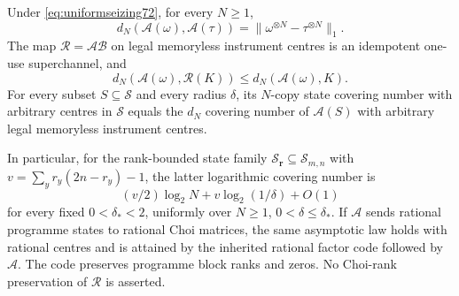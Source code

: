 \begin{theorem}\label{thm:seizablecover72}
Under \eqref{eq:uniformseizing72}, for every $N\ge1$,
\begin{equation}\label{eq:seizablemetric72}
 d_N(\mathcal A(\omega),\mathcal A(\tau))
                =\|\omega^{\otimes N}-\tau^{\otimes N}\|_1.
\end{equation}
The map $\mathcal R=\mathcal A\mathcal B$ on legal memoryless
instrument centres is an idempotent one-use superchannel, and
\begin{equation}\label{eq:seizableretraction72}
 d_N(\mathcal A(\omega),\mathcal R(K))
                 \le d_N(\mathcal A(\omega),K).
\end{equation}
For every subset $S\subseteq\mathcal S$ and every radius $\delta$,
its $N$-copy state covering number with arbitrary centres in
$\mathcal S$ equals the $d_N$ covering number of $\mathcal A(S)$
with arbitrary legal memoryless instrument centres.

In particular, for the rank-bounded state family
$\mathcal S_{\boldsymbol r}\subseteq\mathcal S_{m,n}$ with
$v=\sum_y r_y(2n-r_y)-1$, the latter logarithmic covering number is
\begin{equation}\label{eq:seizablebits72}
       (v/2)\log_2N+v\log_2(1/\delta)+O(1)
\end{equation}
for every fixed $0<\delta_*<2$, uniformly over
$N\ge1$, $0<\delta\le\delta_*$. If $\mathcal A$ sends rational
programme states to rational Choi matrices, the same asymptotic law
holds with rational centres and is attained by the inherited rational
factor code followed by $\mathcal A$. The code preserves programme
block ranks and zeros. No Choi-rank preservation of $\mathcal R$
is asserted.
\end{theorem}
